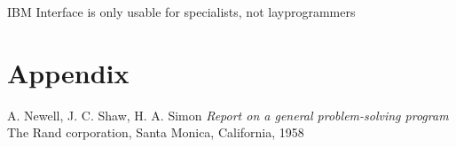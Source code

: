 \documentclass{article}
\begin{document}
IBM Interface is only usable for specialists, not layprogrammers

\section{Appendix}

\begin{thebibliography}{9}
        A. Newell, J. C. Shaw, H. A. Simon
        \textit{Report on a general problem-solving program}
        The Rand corporation, Santa Monica, California, 1958
\end{thebibliography}
\end{document}
